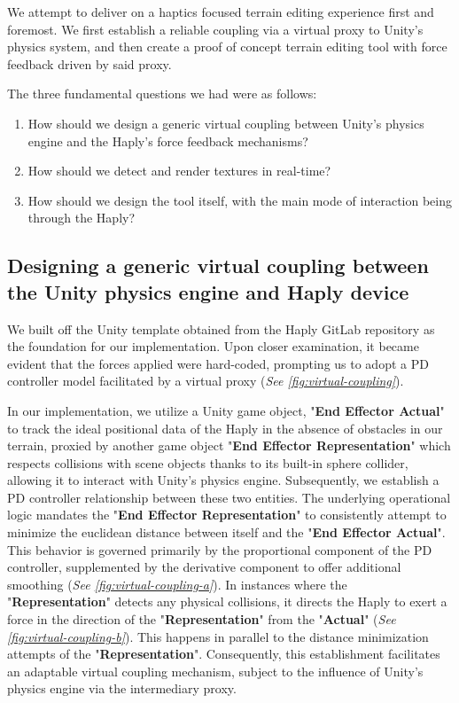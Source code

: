 We attempt to deliver on a haptics focused terrain editing experience first and foremost. We first establish a reliable coupling via a virtual proxy to Unity's physics system, and then create a proof of concept terrain editing tool with force feedback driven by said proxy.

The three fundamental questions we had were as follows:

\begin{enumerate}
    \item How should we design a generic virtual coupling between Unity's physics engine and the Haply's force feedback mechanisms?
    \item How should we detect and render textures in real-time?
    \item How should we design the tool itself, with the main mode of interaction being through the Haply?
\end{enumerate}

\subsection{Designing a generic virtual coupling between the Unity physics engine and Haply device} \label{subsec:virtual-coupling}

We built off the Unity template obtained from the Haply GitLab repository as the foundation for our implementation. Upon closer examination, it became evident that the forces applied were hard-coded, prompting us to adopt a PD controller model \cite{mathworksPID} facilitated by a virtual proxy (\textit{See \ref*{fig:virtual-coupling}}).

In our implementation, we utilize a Unity game object, "\textbf{End Effector Actual}" to track the ideal positional data of the Haply in the absence of obstacles in our terrain, proxied by another game object "\textbf{End Effector Representation}" which respects collisions with scene objects thanks to its built-in sphere collider, allowing it to interact with Unity's physics engine. Subsequently, we establish a PD controller relationship between these two entities. The underlying operational logic mandates the "\textbf{End Effector Representation}" to consistently attempt to minimize the euclidean distance between itself and the "\textbf{End Effector Actual}". This behavior is governed primarily by the proportional component of the PD controller, supplemented by the derivative component to offer additional smoothing (\textit{See \ref*{fig:virtual-coupling-a}}). In instances where the "\textbf{Representation}" detects any physical collisions, it directs the Haply to exert a force in the direction of the "\textbf{Representation}" from the "\textbf{Actual}" (\textit{See \ref*{fig:virtual-coupling-b}}). This happens in parallel to the distance minimization attempts of the "\textbf{Representation}". Consequently, this establishment facilitates an adaptable virtual coupling mechanism, subject to the influence of Unity's physics engine via the intermediary proxy.

